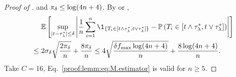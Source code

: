 \begin{proof}[Proof of ]
    and $\pi_\delta \le \log(4{n}+4)$.
    By \cite[Lemma 6.4]{massart2007concentration} or \cite[Theorem 3.1]{baraud2016bounding},
    \begin{align*}
        &\quad~\EE\left[\sup_{|\threshold - \trueThreshold| \le \delta} \left|
        \frac{1}{n} \sum_{i=1}^\No \1_{\{\testStatistics{i} \in [\threshold \wedge \trueThreshold, \threshold \vee \trueThreshold]\}} - \PP\left(\testStatistics{i} \in [\threshold \wedge \trueThreshold, \threshold \vee \trueThreshold]\right)
        \right|\right]\\
        &\le 2 \sigma_\delta \sqrt{\frac{2 \pi_\delta}{\No}} + \frac{8\pi_\delta}{\No}
        \le 4 \sqrt{\frac{\delta \pdfTestStatistics{\max} \log(4\No+4)}{\No}} + \frac{8\log(4\No+4)}{\No}.
    \end{align*}
    Take $C = 16$, Eq.~\eqref{proof:lemm:eq:M.estimator} is valid for $n \ge 5$.
\end{proof}



